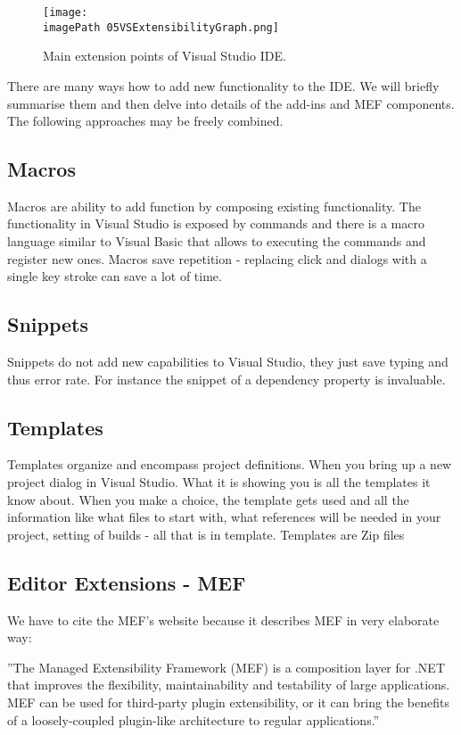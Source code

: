  \begin{figure}
	\centering
		\texttt{[image: \\imagePath 05VSExtensibilityGraph.png]}
		\caption{Main extension points of Visual Studio IDE. }
	\label{fig:05VSExtensibilityGraph}
\end{figure}

There are many ways how to add new functionality to the IDE. We will briefly summarise them and then delve into details of the add-ins and MEF components. The following approaches may be freely combined.

\subsection{Macros}
Macros are ability to add function by composing existing functionality. The functionality in Visual Studio is exposed by commands and  there is a macro language similar to Visual Basic that allows to executing the commands and register new ones. Macros save repetition - replacing click and dialogs with a single key stroke can save a lot of time.

\subsection{Snippets}
Snippets do not add new capabilities to Visual Studio, they just save typing and thus error rate. For instance the snippet of a dependency property is invaluable.

\subsection{Templates}
Templates organize and encompass project definitions. When you bring up a new project dialog in Visual Studio. What it is showing you is all the templates it know about. When you make a choice, the template gets used and all the information like what files to start with, what references will be needed in your project, setting of builds - all that is in template. Templates are Zip files

\subsection{Editor Extensions - MEF}
We have to cite the MEF's website because it describes MEF in very elaborate way:

''The Managed Extensibility Framework (MEF) is a composition layer for .NET that improves the flexibility, maintainability and testability of large applications. MEF can be used for third-party plugin extensibility, or it can bring the benefits of a loosely-coupled plugin-like architecture to regular applications.''\cite{MEFpage}

